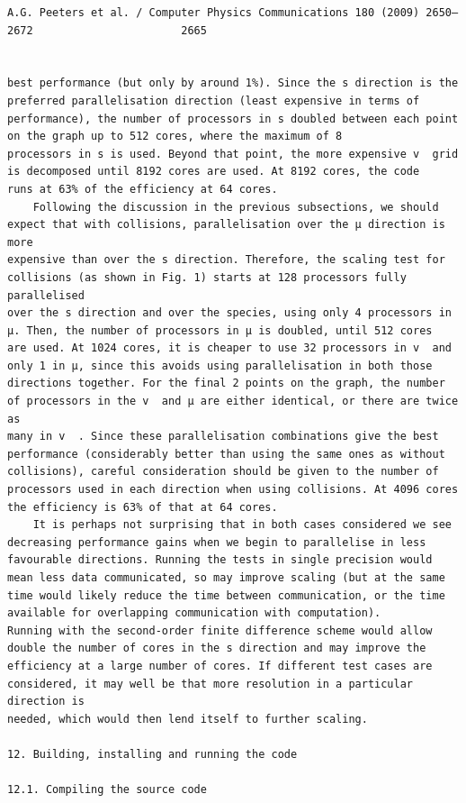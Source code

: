 \documentclass[a4paper]{article}
\newcommand{\gkwpagefont}{\fontsize{6.0pt}{7.55pt}\selectfont}
\begin{document}
\begin{Verbatim}[fontsize=\gkwpagefont]
                                          A.G. Peeters et al. / Computer Physics Communications 180 (2009) 2650–2672                       2665


best performance (but only by around 1%). Since the s direction is the preferred parallelisation direction (least expensive in terms of
performance), the number of processors in s doubled between each point on the graph up to 512 cores, where the maximum of 8
processors in s is used. Beyond that point, the more expensive v  grid is decomposed until 8192 cores are used. At 8192 cores, the code
runs at 63% of the efficiency at 64 cores.
    Following the discussion in the previous subsections, we should expect that with collisions, parallelisation over the μ direction is more
expensive than over the s direction. Therefore, the scaling test for collisions (as shown in Fig. 1) starts at 128 processors fully parallelised
over the s direction and over the species, using only 4 processors in μ. Then, the number of processors in μ is doubled, until 512 cores
are used. At 1024 cores, it is cheaper to use 32 processors in v  and only 1 in μ, since this avoids using parallelisation in both those
directions together. For the final 2 points on the graph, the number of processors in the v  and μ are either identical, or there are twice as
many in v  . Since these parallelisation combinations give the best performance (considerably better than using the same ones as without
collisions), careful consideration should be given to the number of processors used in each direction when using collisions. At 4096 cores
the efficiency is 63% of that at 64 cores.
    It is perhaps not surprising that in both cases considered we see decreasing performance gains when we begin to parallelise in less
favourable directions. Running the tests in single precision would mean less data communicated, so may improve scaling (but at the same
time would likely reduce the time between communication, or the time available for overlapping communication with computation).
Running with the second-order finite difference scheme would allow double the number of cores in the s direction and may improve the
efficiency at a large number of cores. If different test cases are considered, it may well be that more resolution in a particular direction is
needed, which would then lend itself to further scaling.

12. Building, installing and running the code

12.1. Compiling the source code


\end{Verbatim}
\end{document}
